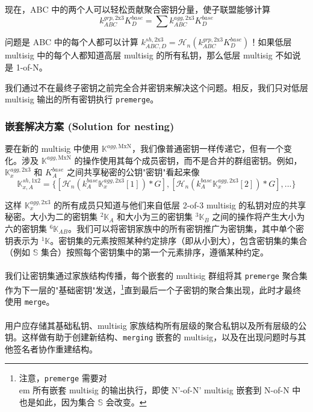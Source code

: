 现在，ABC 中的两个人可以轻松贡献聚合密钥分量，使子联盟能够计算
\[k^{grp,\textrm{2x3}}_{ABC} K^{base}_D = \sum k^{agg,\textrm{2x3}}_{ABC} K^{base}_D\]

问题是 ABC 中的每个人都可以计算 $k^{sh,\textrm{2x3}}_{ABC,D} = \mathcal{H}_n(k^{grp,\textrm{2x3}}_{ABC} K^{base}_D)$！如果低层 multisig 中的每个人都知道高层 multisig 的所有私钥，那么低层 multisig 不如说是 1-of-N。

我们通过不在最终子密钥之前完全合并密钥来解决这个问题。相反，我们只对低层 multisig 输出的所有密钥执行 {\tt premerge}。

\subsubsection*{嵌套解决方案 (Solution for nesting)}

要在新的 multisig 中使用 $\mathbb{K}^{agg,\textrm{MxN}}$，我们像普通密钥一样传递它，但有一个变化。涉及 $\mathbb{K}^{agg,\textrm{MxN}}$ 的操作使用其每个成员密钥，而不是合并的群组密钥。例如，$\mathbb{K}^{agg,\textrm{2x3}}_x$ 和 $K^{base}_A$ 之间共享秘密的公钥"密钥"看起来像\vspace{.175cm}
\[\mathbb{K}^{sh,\textrm{1x2}}_{x,A} = \{ [\mathcal{H}_n(k^{base}_A \mathbb{K}^{agg,\textrm{2x3}}_x[1])*G], [\mathcal{H}_n(k^{base}_A \mathbb{K}^{agg,\textrm{2x3}}_x[2])*G], ...\}\]

这样 $\mathbb{K}^{agg,\textrm{2x3}}_x$ 的所有成员只知道与他们来自低层 2-of-3 multisig 的私钥对应的共享秘密。大小为二的密钥集 ${}^{2}\mathbb{K}_A$ 和大小为三的密钥集 ${}^{3}\mathbb{K}_B$ 之间的操作将产生大小为六的密钥集 ${}^{6}\mathbb{K}_{AB}$。我们可以将密钥家族中的所有密钥推广为密钥集，其中单个密钥表示为 ${}^{1}\mathbb{K}$。密钥集的元素按照某种约定排序（即从小到大），包含密钥集的集合（例如 $\mathbb{S}$ 集合）按照每个密钥集中的第一个元素排序，遵循某种约定。\\\\

我们让密钥集通过家族结构传播，每个嵌套的 multisig 群组将其 {\tt premerge} 聚合集作为下一层的"基础密钥"发送，\footnote{注意，{\tt premerge} 需要对{\\em 所有}嵌套 multisig 的输出执行，即使 N'-of-N' multisig 嵌套到 N-of-N 中也是如此，因为集合 $\mathbb{S}$ 会改变。}直到最后一个子密钥的聚合集出现，此时才最终使用 {\tt merge}。\\\\

用户应存储其基础私钥、multisig 家族结构所有层级的聚合私钥以及所有层级的公钥。这样做有助于创建新结构、{\tt merging} 嵌套的 multisig，以及在出现问题时与其他签名者协作重建结构。



